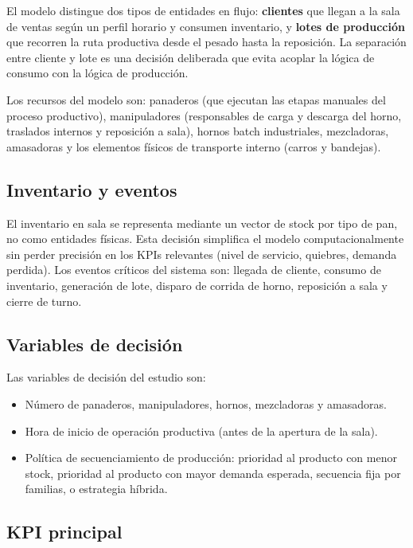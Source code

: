 \documentclass[12pt]{article}
\begin{document}
El modelo distingue dos tipos de entidades en flujo: \textbf{clientes} que llegan a la sala de ventas según un perfil horario y consumen inventario, y \textbf{lotes de producción} que recorren la ruta productiva desde el pesado hasta la reposición. La separación entre cliente y lote es una decisión deliberada que evita acoplar la lógica de consumo con la lógica de producción.

Los recursos del modelo son: panaderos (que ejecutan las etapas manuales del proceso productivo), manipuladores (responsables de carga y descarga del horno, traslados internos y reposición a sala), hornos batch industriales, mezcladoras, amasadoras y los elementos físicos de transporte interno (carros y bandejas).

\subsection{Inventario y eventos}

El inventario en sala se representa mediante un vector de stock por tipo de pan, no como entidades físicas. Esta decisión simplifica el modelo computacionalmente sin perder precisión en los KPIs relevantes (nivel de servicio, quiebres, demanda perdida). Los eventos críticos del sistema son: llegada de cliente, consumo de inventario, generación de lote, disparo de corrida de horno, reposición a sala y cierre de turno.

\subsection{Variables de decisión}

Las variables de decisión del estudio son:
\begin{itemize}
  \item Número de panaderos, manipuladores, hornos, mezcladoras y amasadoras.
  \item Hora de inicio de operación productiva (antes de la apertura de la sala).
  \item Política de secuenciamiento de producción: prioridad al producto con menor stock, prioridad al producto con mayor demanda esperada, secuencia fija por familias, o estrategia híbrida.
\end{itemize}

\subsection{KPI principal}
\end{document}
